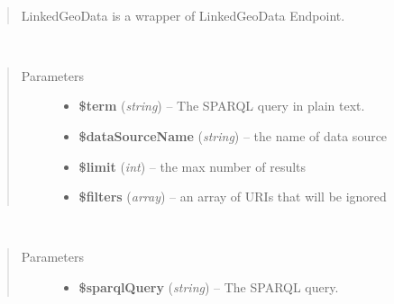 \documentclass[letterpaper,10pt,english]{sphinxmanual}
\begin{document}

\begin{fulllineitems}
\label{docs/api:LinkedGeoData}~\begin{quote}

LinkedGeoData is a wrapper of LinkedGeoData Endpoint.
\end{quote}

\begin{fulllineitems}
\label{docs/api:LinkedGeoData::composeQuery}~\begin{quote}\begin{description}
\item[{Parameters}] \leavevmode\begin{itemize}
\item {} 
\textbf{\$term} (\emph{string}) -- The SPARQL query in plain text.

\item {} 
\textbf{\$dataSourceName} (\emph{string}) -- the name of data source

\item {} 
\textbf{\$limit} (\emph{int}) -- the max number of results

\item {} 
\textbf{\$filters} (\emph{array}) -- an array of URIs that will be ignored

\end{itemize}

\end{description}\end{quote}

\end{fulllineitems}


\begin{fulllineitems}
\label{docs/api:LinkedGeoData::query}~\begin{quote}\begin{description}
\item[{Parameters}] \leavevmode\begin{itemize}
\item {} 
\textbf{\$sparqlQuery} (\emph{string}) -- The SPARQL query.

\end{itemize}

\end{description}\end{quote}

\end{fulllineitems}


\end{fulllineitems}
\end{document}
